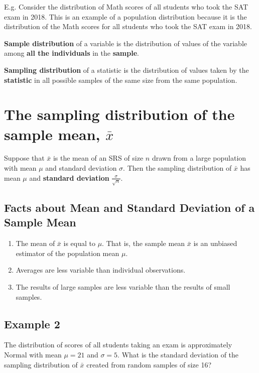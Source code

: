 \vspace{0.2cm}

\noindent E.g. Consider the distribution of Math scores of all students who took the SAT exam in 2018. This is an example of a population distribution because it is the distribution of the Math scores for all students who took the SAT exam in 2018.

\vspace{0.2cm}

\noindent \textbf{Sample distribution} of a variable is the distribution of values of the variable among \textbf{all the individuals} in the \textbf{sample}.

\vspace{0.2cm}

\noindent \textbf{Sampling distribution} of a statistic is the distribution of values taken by the \textbf{statistic} in all possible samples of the same size from the same population.

\section{The sampling distribution of the sample mean, $\bar{x}$}
Suppose that $\bar{x}$ is the mean of an SRS of size $n$ drawn from a large population with mean $\mu$ and standard deviation $\sigma$. Then the sampling distribution of $\bar{x}$ has mean $\mu$ and \textbf{standard deviation} $\frac{\sigma}{\sqrt{n}}$.

\subsection*{Facts about Mean and Standard Deviation of a Sample Mean}

\begin{enumerate}
    \item The mean of $\bar{x}$ is equal to $\mu$. That is, the sample mean $\bar{x}$ is an unbiased estimator of the population mean $\mu$.
    \item Averages are less variable than individual observations.
    \item The results of large samples are less variable than the results of small samples.
\end{enumerate}

\subsection*{Example 2}

The distribution of scores of all students taking an exam is approximately Normal with mean $\mu = 21$ and $\sigma = 5$. What is the standard deviation of the sampling distribution of $\bar{x}$ created from random samples of size 16?


